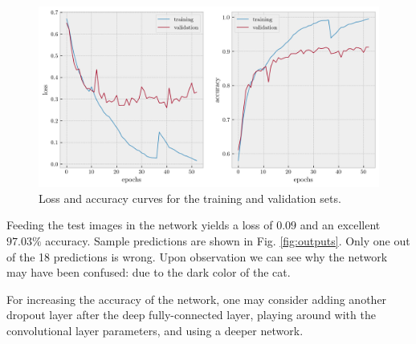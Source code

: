\documentclass[12pt,a4paper]{article}
\begin{document}
\begin{figure}[htb]
	\centering
	\includegraphics[width=\textwidth]{loss-acc.png}
	\caption{Loss and accuracy curves for the training and validation sets.}
	\label{fig:loss-curves}
\end{figure}

\noindent Feeding the test images in the network yields a loss of $0.09$ and an excellent $97.03\%$ accuracy. Sample predictions are shown in Fig. \ref{fig:outputs}. Only one out of the 18 predictions is wrong. Upon observation we can see why the network may have been confused: due to the dark color of the cat.

For increasing the accuracy of the network, one may consider adding another dropout layer after the deep fully-connected layer, playing around with the convolutional layer parameters, and using a deeper network.
\end{document}
